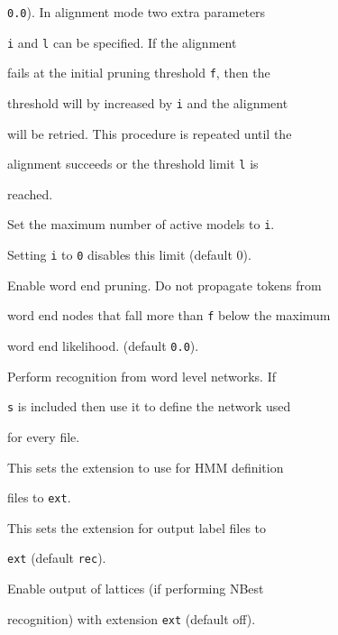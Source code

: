 \begin{optlist}
        \texttt{0.0}). In alignment mode two extra parameters


        \texttt{i} and \texttt{l} can be specified. If the alignment


        fails at the initial pruning threshold \texttt{f}, then the


        threshold will by increased by \texttt{i} and the alignment


        will be retried. This procedure is repeated until the


        alignment succeeds or the threshold limit \texttt{l} is


        reached.        





   Set the maximum number of active models to \texttt{i}.


        Setting \texttt{i} to \texttt{0} disables this limit (default 0).





   Enable word end pruning.  Do not propagate tokens from


        word end nodes that fall more than \texttt{f} below the maximum 


        word end likelihood.  (default \texttt{0.0}).





   Perform recognition from word level networks.  If


        \texttt{s} is included then use it to define the network used


        for every file.





    This sets the extension to use for HMM definition


      files to \texttt{ext}.





    This sets the extension for output label files to


        \texttt{ext} (default \texttt{rec}).





    Enable output of lattices (if performing NBest


        recognition) with extension \texttt{ext} (default off).






\end{optlist}
